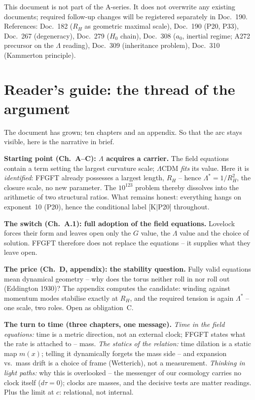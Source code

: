 \documentclass[11pt]{report}
\begin{document}
This document is not part of the A-series. It does not overwrite any
existing documents; required follow-up changes will be registered
separately in Doc.~190.
References: Doc.~182 ($R_H$ as geometric maximal scale),
Doc.~190 (P20, P33), Doc.~267 (degeneracy), Doc.~279 ($H_0$ chain),
Doc.~308 ($a_0$, inertial regime; A272 precursor on the $\Lambda$
reading), Doc.~309 (inheritance problem), Doc.~310 (Kammerton
principle).

\section*{Reader's guide: the thread of the argument}

The document has grown; ten chapters and an appendix. So that the
arc stays visible, here is the narrative in brief.

\textbf{Starting point (Ch.~A--C): $\Lambda$ acquires a carrier.}
The field equations contain a term setting the largest curvature
scale; $\Lambda$CDM \emph{fits} its value. Here it is
\emph{identified}: FFGFT already possesses a largest length, $R_H$
-- hence $\Lambda^{*} = 1/R_H^2$, the closure scale, no new
parameter. The $10^{123}$ problem thereby dissolves into the
arithmetic of two structural ratios. What remains honest:
everything hangs on exponent~10 (P20), hence the conditional label
[K$|$P20] throughout.

\textbf{The switch (Ch.~A.1): full adoption of the field
equations.} Lovelock forces their form and leaves open only the
$G$ value, the $\Lambda$ value and the choice of solution. FFGFT
therefore does not replace the equations -- it supplies what they
leave open.

\textbf{The price (Ch.~D, appendix): the stability question.}
Fully valid equations mean dynamical geometry -- why does the
torus neither roll in nor roll out (Eddington 1930)? The appendix
computes the candidate: winding against momentum modes stabilise
exactly at $R_H$, and the required tension is again $\Lambda^{*}$
-- one scale, two roles. Open as obligation~C.

\textbf{The turn to time (three chapters, one message).}
\emph{Time in the field equations:} time is a metric direction,
not an external clock; FFGFT states what the rate is attached to
-- mass. \emph{The statics of the relation:} time dilation is a
static map $m(x)$; telling it dynamically forgets the mass side --
and expansion vs.\ mass drift is a choice of frame (Wetterich),
not a measurement. \emph{Thinking in light paths:} why this is
overlooked -- the messenger of our cosmology carries no clock
itself ($d\tau = 0$); clocks are masses, and the decisive tests
are matter readings. Plus the limit at $c$: relational, not
internal.
\end{document}
